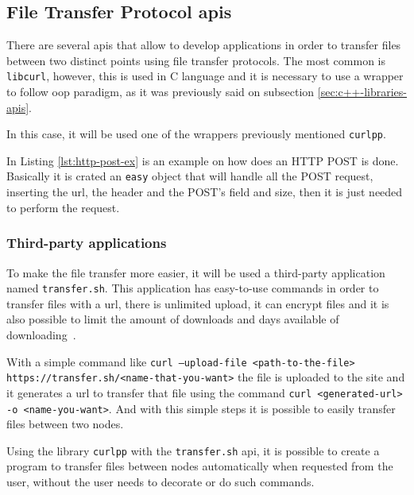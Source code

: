 \subsection{File Transfer Protocol \gls{api}s}
\label{sub-sec:ftp-apis}
There are several \gls{api}s that allow to develop applications in order to transfer files between two distinct points using file transfer protocols. The most common is \texttt{libcurl}, however, this is used in C language and it is necessary to use a wrapper to follow \gls{oop} paradigm, as it was previously said on subsection \ref{sec:c++-libraries-apis}.

In this case, it will be used one of the wrappers previously mentioned \texttt{curlpp}.

In Listing \ref{lst:http-post-ex} is an example on how does an HTTP POST is done. Basically it is crated an \texttt{easy} object that will handle all the POST request, inserting the \gls{url}, the header and the POST's field and size, then it is just needed to perform the request.
%


\subsubsection{Third-party applications}

To make the file transfer more easier, it will be used a third-party application named \texttt{transfer.sh}. This application has easy-to-use commands in order to transfer files with a \gls{url}, there is unlimited upload, it can encrypt files and it is also possible to limit the amount of downloads and days available of downloading~\cite{transfer-sh}.

With a simple command like \texttt{curl --upload-file <path-to-the-file> https://transfer.sh/<name-that-you-want>} the file is uploaded to the site and it generates a \gls{url} to transfer that file using the command \texttt{curl <generated-url> -o <name-you-want>}.
And with this simple steps it is possible to easily transfer files between two nodes.

Using the library \texttt{curlpp} with the \texttt{transfer.sh} \gls{api}, it is possible to create a program to transfer files between nodes automatically when requested from the user, without the user needs to decorate or do such commands.
%
